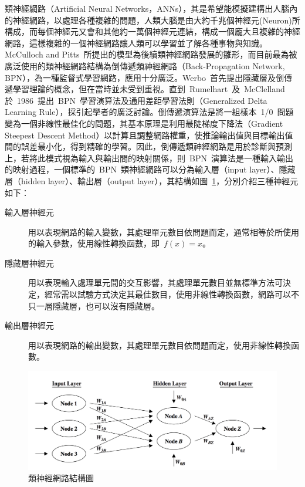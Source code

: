 類神經網路（Artificial Neural Networks，ANNs），其是希望能模擬建構出人腦內的神經網路，以處理各種複雜的問題，人類大腦是由大約千兆個神經元(Neuron)所構成，而每個神經元又會和其他約一萬個神經元連結，構成一個龐大且複雜的神經網路，這樣複雜的一個神經網路讓人類可以學習並了解各種事物與知識。McCulloch and Pitts~\cite{mcculloch1943logical}所提出的模型為後續類神經網路發展的雛形，而目前最為被廣泛使用的類神經網路結構為倒傳遞類神經網路（Back-Propagation Network, BPN），為一種監督式學習網路，應用十分廣泛。Werbo~\cite{werbos1974beyond}首先提出隱藏層及倒傳遞學習理論的概念，但在當時並未受到重視。直到~Rumelhart~及~McClelland\cite{rummelhart1986learning}於~1986~提出~BPN~學習演算法及通用差距學習法則（Generalized Delta Learning Rule），採引起學者的廣泛討論。倒傳遞演算法是將一組樣本~1/0~問題變為一個非線性最佳化的問題，其基本原理是利用最陡梯度下降法（Gradient Steepest Descent Method）以計算且調整網路權重，使推論輸出值與目標輸出值間的誤差最小化，得到精確的學習。因此，倒傳遞類神經網路是用於診斷與預測上，若將此模式視為輸入與輸出間的映射關係，則~BPN~演算法是一種輸入輸出的映射過程，一個標準的~BPN~類神經網路可以分為輸入層（input layer）、隱藏層（hidden layer）、輸出層（output layer），其結構如圖~\ref{fig:ANN-network}\cite{larose2005discovering}，分別介紹三種神經元如下：

\begin{description}
  \item [輸入層神經元]
  用以表現網路的輸入變數，其處理單元數目依問題而定，通常相等於所使用的輸入參數，使用線性轉換函數，即~$f(x)=x$。
  \item [隱藏層神經元]
  用以表現輸入處理單元間的交互影響，其處理單元數目並無標準方法可決定，經常需以試驗方式決定其最佳數目，使用非線性轉換函數，網路可以不只一層隱藏層，也可以沒有隱藏層。
  \item [輸出層神經元]
  用以表現網路的輸出變數，其處理單元數目依問題而定，使用非線性轉換函數。
\end{description}

\begin{figure}[hbtp]
  \begin{center}
    \includegraphics[width=1.0\textwidth]{figures/anns-network.png}
    \caption{類神經網路結構圖} 
    \label{fig:ANN-network}
  \end{center}
\end{figure}

